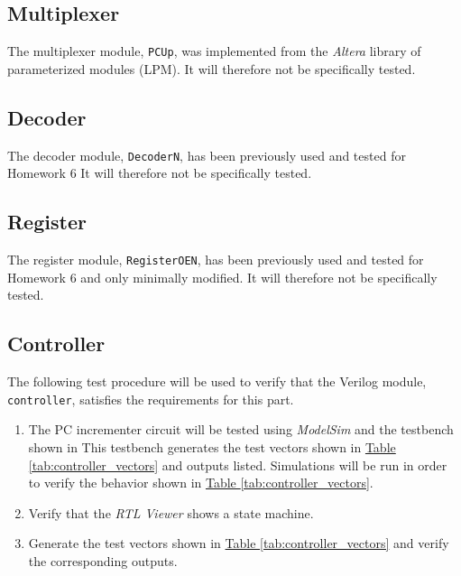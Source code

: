 \subsection{Multiplexer} %
\label{sub:multiplexer}

The multiplexer module, \verb|PCUp|, was implemented from the \emph{Altera} library of parameterized modules (LPM).
It will therefore not be specifically tested.


\subsection{Decoder} %
\label{sub:decoder}

The decoder module, \verb|DecoderN|, has been previously used and tested for Homework 6
It will therefore not be specifically tested.

\subsection{Register} %
\label{sub:register}

The register module, \verb|RegisterOEN|, has been previously used and tested for Homework 6 and only minimally modified.
It will therefore not be specifically tested.

\subsection{Controller} %
\label{sub:controller}

The following test procedure will be used to verify that the Verilog module, \verb|controller|, satisfies the requirements for this part.

\begin{enumerate}
    \item The PC incrementer circuit will be tested using \emph{ModelSim} and the testbench shown in %
    This testbench generates the test vectors shown in
    \hyperref[tab:controller_vectors]{Table \ref*{tab:controller_vectors}} and outputs listed.
    Simulations will be run in order to verify the behavior shown in
    \hyperref[tab:controller_vectors]{Table \ref*{tab:controller_vectors}}.
    \item Verify that the \emph{RTL Viewer} shows a state machine.
    \item Generate the test vectors shown in \hyperref[tab:controller_vectors]{Table \ref*{tab:controller_vectors}}
    and verify the corresponding outputs.
\end{enumerate}

